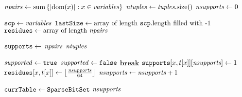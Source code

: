      \STATE $\mathit{npairs} \leftarrow \mathrm{sum}\left\{|\text{dom}({x})| : x \in \mathit{variables}\right\}$
      \label{line:init:3}
      \STATE $\mathit{ntuples} \leftarrow \mathit{tuples}.\mathrm{size}()$ 
      \STATE $\mathit{nsupports} \leftarrow 0$  \label{line:init:4}
      
      \STATE $\texttt{scp} \leftarrow \mathit{variables}$ \label{line:init:1}
      \STATE $\texttt{lastSize} \leftarrow \text{array of  length~} \texttt{scp}.\mathrm{length}
      ~\text{filled with -1}$  \label{line:init:2}
      \STATE $\texttt{residues} \leftarrow \text{array of length~} \mathit{npairs}$ \label{line:init:9}
      
      \STATE $\texttt{supports} \leftarrow$ $\mathit{npairs}$
      $\mathit{ntuples}$ \label{line:init:5}

       \label{line:init:6}
        \STATE $\mathit{supported} \leftarrow \texttt{true}$
            \STATE $\mathit{supported} \leftarrow \texttt{false}$
            \STATE $\textbf{break}$ 
          \ENDIF
        \ENDFOREACH
             \label{line:init:9}
              \STATE $\texttt{supports}[x,t[x]][\mathit{nsupports}] \leftarrow 1$ \label{line:init:10}
              \STATE $\texttt{residues}[x,t[x]] \leftarrow \left\lfloor\frac{\mathit{nsupports}}{64}\right\rfloor$
              \label{line:init:11}
              \STATE $\mathit{nsupports} \leftarrow \mathit{nsupports} + 1$
            \ENDFOREACH
          \ENDIF
      \ENDFOREACH \label{line:init:7}

       \label{line:init:12}
          \label{line:init:14}
      \ENDFOREACH
      \STATE $\texttt{currTable} \leftarrow \texttt{SparseBitSet}$  $\mathit{nsupports}$  \label{line:init:15}
      \Endfunc
